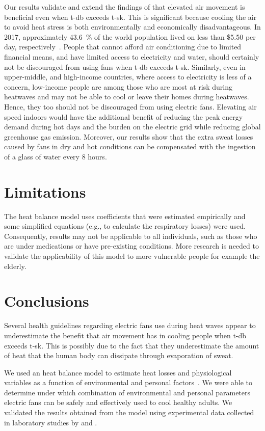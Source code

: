 Our results validate and extend the findings of  that elevated air movement is beneficial even when \ac{t-db} exceeds \acf{t-sk}.
This is significant because cooling the air to avoid heat stress is both environmentally and economically disadvantageous.
In 2017, approximately 43.6~\% of the world population lived on less than \$5.50 per day, respectively~\cite{PovertyO1:online}.
People that cannot afford air conditioning due to limited financial means, and have limited access to electricity and water, should certainly not be discouraged from using fans when \ac{t-db} exceeds \ac{t-sk}.
Similarly, even in upper-middle, and high-income countries, where access to electricity is less of a concern, low-income people are among those who are most at risk during heatwaves and may not be able to cool or leave their homes during heatwaves.
Hence, they too should not be discouraged from using electric fans.
Elevating air speed indoors would have the additional benefit of reducing the peak energy demand during hot days and the burden on the electric grid while reducing global greenhouse gas emission.
Moreover, our results show that the extra sweat losses caused by fans in dry and hot conditions can be compensated with the ingestion of a glass of water every 8 hours.

\section*{Limitations}
The  heat balance model uses coefficients that were estimated empirically and some simplified equations (e.g., to calculate the respiratory losses) were used.
Consequently, results may not be applicable to all individuals, such as those who are under medications or have pre-existing conditions.
More research is needed to validate the applicability of this model to more vulnerable people for example the elderly.

\section{Conclusions}\label{sec:conclusions}
Several health guidelines regarding electric fans use during heat waves appear to underestimate the benefit that air movement has in cooling people when \acf{t-db} exceeds \acf{t-sk}.
This is possibly due to the fact that they underestimate the amount of heat that the human body can dissipate through evaporation of sweat.

We used an heat balance model to estimate heat losses and physiological variables as a function of environmental and personal factors~\cite{Gagge1986}.
We were able to determine under which combination of environmental and personal parameters electric fans can be safely and effectively used to cool healthy adults.
We validated the results obtained from the  model using experimental data collected in laboratory studies by  and .


